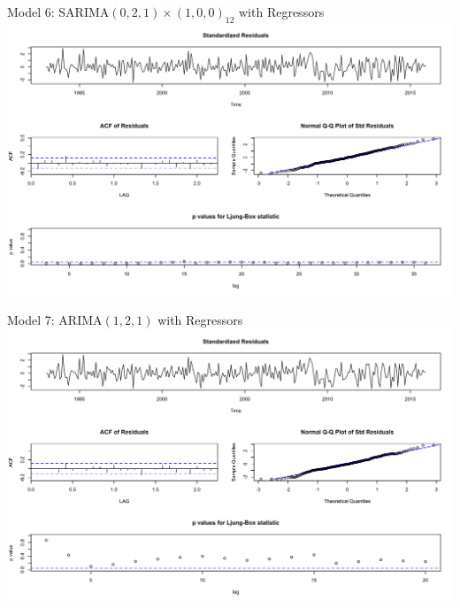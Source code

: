 {     \begin{frame}{Model 6: SARIMA\((0,2,1) \times (1,0,0)_{12}\) with Regressors}
     	\includegraphics[width=\linewidth]{images/seasonallyadjustedmodel6}
     \end{frame}
     
     
     \begin{frame}{Model 7: ARIMA\((1,2,1)\) with Regressors}
     	\includegraphics[width=\linewidth]{images/seasonallyadjustedmodel7}
     \end{frame}  
}	



